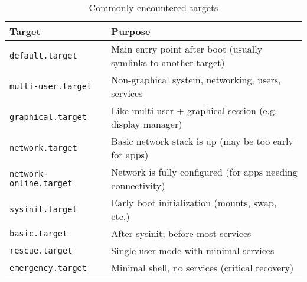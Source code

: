 \documentclass[openany, 12pt]{book}
\begin{document}
\begin{table}
  \begin{center}
    \begin{tabular}{ll}
      \toprule
      \textbf{Target}                & \textbf{Purpose}                                                 \\
      \midrule
      \texttt{default.target}        & Main entry point after boot (usually symlinks to another target) \\
      \texttt{multi-user.target}     & Non-graphical system, networking, users, services                \\
      \texttt{graphical.target}      & Like multi-user + graphical session (e.g. display manager)       \\
      \texttt{network.target}        & Basic network stack is up (may be too early for apps)            \\
      \texttt{network-online.target} & Network is fully configured (for apps needing connectivity)      \\
      \texttt{sysinit.target}        & Early boot initialization (mounts, swap, etc.)                   \\
      \texttt{basic.target}          & After sysinit; before most services                              \\
      \texttt{rescue.target}         & Single-user mode with minimal services                           \\
      \texttt{emergency.target}      & Minimal shell, no services (critical recovery)                   \\
      \bottomrule
    \end{tabular}
  \end{center}
  \caption{Commonly encountered targets}
\end{table}
\end{document}
